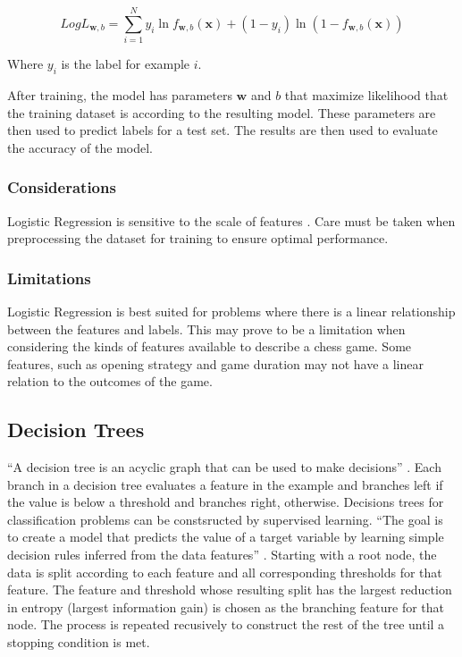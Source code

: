 \documentclass[12pt]{article}
\begin{document}
\[
LogL_{\textbf{w},b} =
\sum_{i=1}^N y_i\ln{f_{\textbf{w},b}(\textbf{x}) + (1-y_i)\ln(1 - f_{\textbf{w},b}(\textbf{x}))}
\]

\noindent Where $y_i$ is the label for example $i$.

\vspace{12pt}After training, the model has parameters $\textbf{w}$ and $b$ that maximize likelihood that the training dataset is according to the resulting model. These parameters are then used to predict labels for a test set. The results are then used to evaluate the accuracy of the model.

\subsubsection{Considerations}Logistic Regression is sensitive to the scale of features \cite{Alon1997}. Care must be taken when preprocessing the dataset for training to ensure optimal performance.

\subsubsection{Limitations}Logistic Regression is best suited for problems where there is a linear relationship between the features and labels. This may prove to be a limitation when considering the kinds of features available to describe a chess game. Some features, such as opening strategy and game duration may not have a linear relation to the outcomes of the game.

\subsection{Decision Trees}

``A decision tree is an acyclic graph that can be used to make decisions'' \cite[Chapter 3, Section 3.3]{100MLB}. Each branch in a decision tree evaluates a feature in the example and branches left if the value is below a threshold and branches right, otherwise. Decisions trees for classification problems can be constsructed by supervised learning. ``The goal is to create a model that predicts the value of a target variable by learning simple decision rules inferred from the data features'' \cite{sklearnDT}. Starting with a root node, the data is split according to each feature and all corresponding thresholds for that feature. The feature and threshold whose resulting split has the largest reduction in entropy (largest information gain) is chosen as the branching feature for that node. The process is repeated recusively to construct the rest of the tree until a stopping condition is met.
\end{document}
